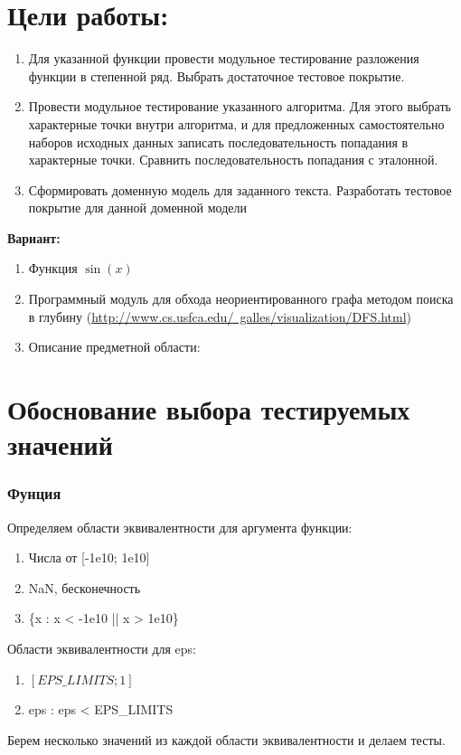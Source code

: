 \documentclass[12pt,onecolumn]{article}
\begin{document}
\section*{Цели работы:}
\begin{enumerate}
    \item Для указанной функции провести модульное тестирование разложения функции в степенной ряд. Выбрать достаточное тестовое покрытие.
    \item Провести модульное тестирование указанного алгоритма. Для этого выбрать характерные точки внутри алгоритма, и для предложенных самостоятельно наборов исходных данных записать последовательность попадания в характерные точки. Сравнить последовательность попадания с эталонной.
    \item Сформировать доменную модель для заданного текста.  Разработать тестовое покрытие для данной доменной модели
\end{enumerate}
\textbf{Вариант:}
\begin{enumerate}
    \item Функция $\sin(x)$
    \item Программный модуль для обхода неориентированного графа методом поиска в глубину (\href{http://www.cs.usfca.edu/~galles/visualization/DFS.html}{http://www.cs.usfca.edu/~galles/visualization/DFS.html})
    \item {Описание предметной области:\\
    \noindent{}
    }
\end{enumerate}
\section*{Обоснование выбора тестируемых значений}
\subsubsection*{Фунция}
Определяем области эквивалентности для аргумента функции:
\begin{enumerate}
    \item Числа от [-1e10; 1e10]
    \item NaN, бесконечность
    \item \{x : x < -1e10 || x > 1e10\}
\end{enumerate}
Области эквивалентности для eps:
\begin{enumerate}
    \item $\left[ EPS\_LIMITS; 1\right]$
    \item {eps : eps < EPS\_LIMITS}
\end{enumerate}
Берем несколько значений из каждой области эквивалентности и делаем тесты.
\end{document}
